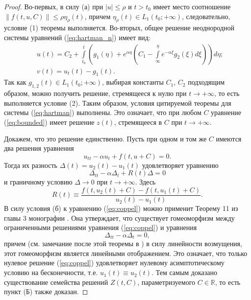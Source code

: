 \begin{proof}
Во-первых, в силу (а) при $|u| \le \rho$ и $t > t_0$ имеет место соотношение $\|f(t, u, C)\| \le \rho \eta_{\rho}(t)$, причем $\eta_{\rho}(t) \in L_1(t_0; +\infty)$, следовательно, условие (1) теоремы выполняется.
Во-вторых, общее решение неоднородной системы уравнений (\ref{eq:hartman_n}) имеет вид:
%
\begin{eqnarray}
& u(t) = C_2 + \int  \limits_{t_0}^t \left( g_1(\eta) + e^{\alpha \eta} \left(C_1 - \int \limits_{\infty}^{\eta} e^{-\alpha \xi} g_2(\xi) d\xi \right) \right) d{\eta}; \\
& \nonumber v(t) = u_t(t) - g_1(t).
\end{eqnarray}
%
Так как $g_{1,2}(t) \in L_1(t_0; +\infty)$, выбирая константы $C_1$, $C_2$ подходящим образом, можно получить решение, стремящееся к нулю при $t \to +\infty$, то есть выполняется условие (2).
Таким образом, условия цитируемой теоремы для системы (\ref{eq:hartman}) выполнены.
Это означает, что при любом $C$ уравнение (\ref{eq:bounded}) имеет решение $z(t)$, стремящееся в $C$ при $t \to +\infty$.

Докажем, что это решение единственно.
Пусть при одном и том же $C$ имеются два решения уравнения
%
\begin{equation}
u_{tt} - \alpha u_t + f(t, u + C) = 0.
\label{eq:bounded_aux}
\end{equation}
%
Тогда их разность $\Delta(t) = u_2(t) - u_1(t)$ удовлетворяет уравнению
%
\begin{equation}
\Delta_{tt} - \alpha \Delta_t + R(t) \Delta = 0
\label{eq:coppel}
\end{equation}
%
и граничному условию $\Delta \to 0$ при $t \to +\infty$.
Здесь
%
\begin{equation}
R(t) \equiv \frac{f(t,u_2(t)+C)-f(t,u_1(t)+C)}{u_2(t)-u_1(t)}.
\end{equation}
%
В силу условия (б) к уравнению (\ref{eq:coppel}) можно применит Теорему 11 из главы 3 монографии \cite{Coppel}.
Она утверждает, что существует гомеоморфизм между ограниченными решениями уравнения (\ref{eq:coppel}) и уравнения
%
\begin{equation}
\Delta_{tt} - \alpha \Delta_t = 0,
\label{eq:coppel_linear}
\end{equation}
%
причем (см. замечание после этой теоремы в \cite{Coppel}) в силу линейности возмущения, этот гомеоморфизм является линейными отображением.
Это означает, что только нулевое решение (\ref{eq:coppel}) удовлетворяет нулевому асимптотическому условию на бесконечности, т.е. $u_1(t) \equiv u_2(t)$.
Тем самым доказано существование семейства решений $Z(t, C)$, параметризуемого $C \in \mathbb{R}$, то есть пункт (Б) также доказан.


\end{proof}
